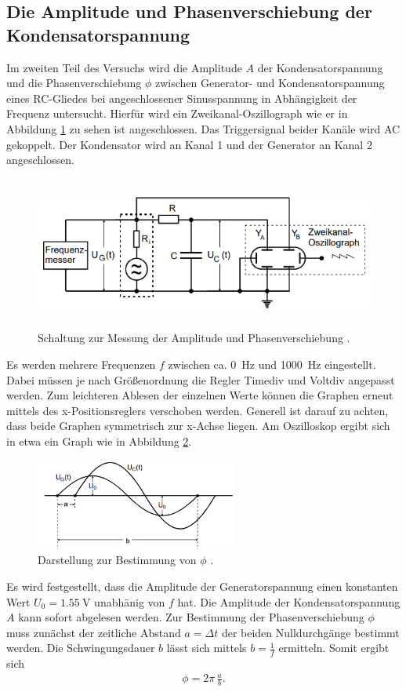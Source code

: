 \subsection{Die Amplitude und Phasenverschiebung der Kondensatorspannung}
Im zweiten Teil des Versuchs wird die Amplitude $A$ der Kondensatorspannung und die Phasenverschiebung $\phi$ zwischen Generator-
und Kondensatorspannung eines RC-Gliedes bei angeschlossener Sinusspannung in Abhängigkeit der Frequenz untersucht.
Hierfür wird ein Zweikanal-Oszillograph wie er in Abbildung \ref{fig:ampl_phasenverschiebung} zu sehen ist angeschlossen.
Das Triggersignal beider Kanäle wird AC gekoppelt.
Der Kondensator wird an Kanal 1 und der Generator an Kanal 2 angeschlossen.
\begin{figure}[H]
    \centering
    \includegraphics[height=5cm]{abbildungen/ampl_phasenverschiebung.png}
    \caption{Schaltung zur Messung der Amplitude und Phasenverschiebung \cite{man:v353}.}
    \label{fig:ampl_phasenverschiebung}
\end{figure}
\noindent
Es werden mehrere Frequenzen $f$ zwischen ca. \qty{0}{\hertz} und \qty{1000}{\hertz} eingestellt.
Dabei müssen je nach Größenordnung die Regler Timediv und Voltdiv angepasst werden.
Zum leichteren Ablesen der einzelnen Werte können die Graphen erneut mittels des x-Positionsreglers verschoben werden.
Generell ist darauf zu achten, dass beide Graphen symmetrisch zur x-Achse liegen.
Am Oszilloskop ergibt sich in etwa ein Graph wie in Abbildung \ref{fig:graph_phasenverschiebung}.
\begin{figure}[H]
    \centering
    \includegraphics[height=3cm]{abbildungen/graph_phasenverschiebung.png}
    \caption{Darstellung zur Bestimmung von $\phi$ \cite{man:v353}.}
    \label{fig:graph_phasenverschiebung}
\end{figure}
\noindent
Es wird festgestellt, dass die Amplitude der Generatorspannung einen konstanten Wert $U_0 = \qty[]{1.55}{\volt}$ unabhänig von $f$ hat.
Die Amplitude der Kondensatorspannung $A$ kann sofort abgelesen werden.
Zur Bestimmung der Phasenverschiebung $\phi$ muss zunächst der zeitliche Abstand $a = \Delta t$ der beiden Nulldurchgänge bestimmt werden.
Die Schwingungsdauer $b$ lässt sich mittels $b = \frac{1}{f}$ ermitteln.
Somit ergibt sich 
\begin{align}
    \phi = 2 \pi \, \frac{a}{b}.
    \label{eq:phase}
\end{align}
%